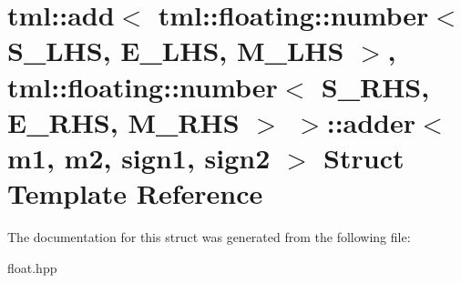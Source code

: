 \hypertarget{structtml_1_1add_3_01tml_1_1floating_1_1number_3_01S__LHS_00_01E__LHS_00_01M__LHS_01_4_00_01tml_9298c006132ddbadadf02f2a85069d1c}{\section{tml\+:\+:add$<$ tml\+:\+:floating\+:\+:number$<$ S\+\_\+\+L\+H\+S, E\+\_\+\+L\+H\+S, M\+\_\+\+L\+H\+S $>$, tml\+:\+:floating\+:\+:number$<$ S\+\_\+\+R\+H\+S, E\+\_\+\+R\+H\+S, M\+\_\+\+R\+H\+S $>$ $>$\+:\+:adder$<$ m1, m2, sign1, sign2 $>$ Struct Template Reference}
\label{structtml_1_1add_3_01tml_1_1floating_1_1number_3_01S__LHS_00_01E__LHS_00_01M__LHS_01_4_00_01tml_9298c006132ddbadadf02f2a85069d1c}
}


The documentation for this struct was generated from the following file\+:\begin{DoxyCompactItemize}
\item 
float.\+hpp\end{DoxyCompactItemize}
